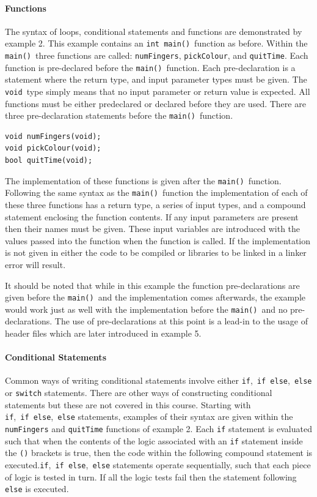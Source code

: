 \documentclass[11pt]{scrartcl}
\def\main{\texttt{main()}}
\def\intmain{\texttt{int main()}}
\def\void{\texttt{void}}
\begin{document}
\paragraph{Functions}
The syntax of loops, conditional statements and functions are
demonstrated by example 2.  This example contains an \intmain\ function
as before.  Within the \main\ three functions are called:
\texttt{numFingers}, \texttt{pickColour}, and
\texttt{quitTime}.  Each function is pre-declared before the \main\ function.  Each pre-declaration is a statement where the return type, and input parameter types must be given.  The \void\ type simply means that no input parameter or return value is expected.  All functions must be either predeclared or declared before they are used.  There are three pre-declaration statements before the \main\ function.
\begin{lstlisting}
void numFingers(void);
void pickColour(void);
bool quitTime(void);
\end{lstlisting}
The implementation of these functions is given after the \main\ function.  Following the same syntax as the \main\ function the implementation of each of these three functions has a return type, a series of input types, and a compound statement enclosing the function contents.  If any input parameters are present then their names must be given.  These input variables are introduced with the values passed into the function when the function is called.  If the implementation is not given in either the code to be compiled or libraries to be linked in a linker error will result.

It should be noted that while in this example the function pre-declarations are given before the \main\ and the implementation
comes afterwards, the example would work just as well with the
implementation before the \main\ and no pre-declarations.  The use of pre-declarations at this point is a lead-in to the usage of header files which are later introduced in example 5.

\paragraph{Conditional Statements}
Common ways of writing conditional statements involve either \texttt{if},~\texttt{if~else},~\texttt{else} or \texttt{switch} statements.  There are other ways of constructing conditional statements but these are not covered in this course.  Starting with \texttt{if},~\texttt{if~else},~\texttt{else} statements, examples of their syntax are given within the \texttt{numFingers} and \texttt{quitTime} functions of example 2.  Each \texttt{if} statement is evaluated such that when the contents of the logic associated with an \texttt{if} statement inside the \texttt{()} brackets is true, then the code within the following compound statement is executed.\texttt{if},~\texttt{if~else},~\texttt{else} statements operate
sequentially, such that each piece of logic is tested in turn.  If all the logic tests fail then the statement following \texttt{else} is executed.
\end{document}
